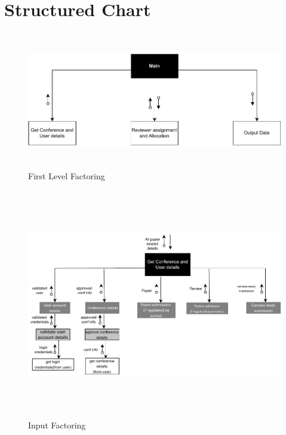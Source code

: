 \documentclass[english,a4paper,12pt]{report}
\begin{document}
\section{Structured Chart}
\begin{figure}[h!]
\centering
 \includegraphics[width=15cm,height=6cm]{SD-Images/firstlevel.pdf}  
\caption{First Level Factoring}
\end{figure}

\begin{figure}[h!]
\centering
 \includegraphics[width=18cm,height=10cm]{SD-Images/input-factoring.pdf}  
\caption{Input Factoring}
\end{figure}
\end{document}
